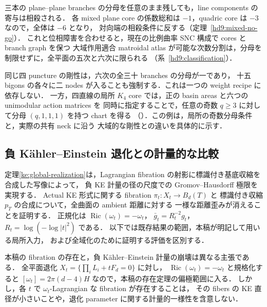 三本の plane--plane branches の分母を任意のまま残しても，line components の寄与は相殺される．
各 mixed plane core の係数総和は $-1$，quadric core は $-3$ なので，全体は $-6$ となり，
対向端の相殺条件に反する（定理~\ref{hd9:mixed-no-go}）．
これと位相障害を合わせると，現在の比例曲率 SNC 構成で cores と branch graph を保つ
大域作用適合 matroidal atlas が可能な次数分割は，分母を制限せずに，全平面の五次と六次に限られる
（系~\ref{hd9:classification}）．

同じ四 puncture の剛性は，六次の全三十 branches の分母が一であり，
十五 bigons の各々に二 nodes が入ることも強制する．これは一つの weight recipe に依存しない．
一方，四直線の局所 $K_4$ core では，正の basin areas と六つの unimodular action matrices を
同時に指定することで，任意の奇数 $q\ge3$ に対して分母 $(q,1,1,1)$ を持つ chart を得る
（\cite{QuinticArithmetic}）．この例は，局所の奇数分母条件と，実際の共有 neck に沿う
大域的な剛性との違いを具体的に示す．

\subsection{負 Kähler--Einstein 退化との計量的な比較}\label{intro:ke-collapse}

定理\ref{ke:global-realization}は，Lagrangian fibration の射影に標識付き基底収縮を合成した写像によって，
負 KE 計量の径の尺度での Gromov--Hausdorff 極限を実現する．
Actual KE 形式に関する fibration $\pi_t:X_t\to B_d(T)$ と
標識付き収縮 $p_T$ の合成について，全曲面の ambient 距離に対する
一様な距離歪みが消えることを証明する．
正規化は $\operatorname{Ric}(\omega_t)=-\omega_t$，
$\bar g_t=R_t^{-2}g_t$，$R_t=\log(-\log|t|^2)$ である．
以下では既存結果の範囲，本稿が明記して用いる局所入力，
および全域化のために証明する評価を区別する．

本稿の fibration の存在と，負 Kähler--Einstein 計量の崩壊は異なる主張である．
全平面退化 $X_t=\{\prod_i L_i+tF_d=0\}$ に対し，
$\operatorname{Ric}(\omega_t)=-\omega_t$ と規格化すると
$[\omega_t]=2\pi(d-4)H$ なので，本稿の存在定理の偏極範囲に入る．
しかし，各 $t$ で $\omega_t$-Lagrangian な fibration が存在することは，
その fibers の KE 直径が小さいことや，退化 parameter に関する計量的一様性を含意しない．

